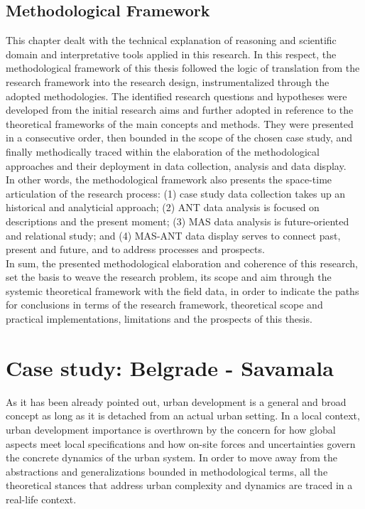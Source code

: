 \documentclass[11pt]{report}
\begin{document}
\section{Methodological Framework}

This chapter dealt with the technical explanation of reasoning and scientific domain and interpretative tools applied in this research.
In this respect, the methodological framework of this thesis followed the logic of translation from the research framework into the research design, instrumentalized through the adopted methodologies.
The identified research questions and hypotheses were developed from the initial research aims and further adopted in reference to the theoretical frameworks of the main concepts and methods. 
They were presented in a consecutive order, then bounded in the scope of the chosen case study, and finally methodically traced within the elaboration of the methodological approaches and their deployment in data collection, analysis and data display.
\\
In other words, the methodological framework also presents the space-time articulation of the research process:
(1) case study data collection takes up an historical and analyticial approach;
(2) ANT data analysis is focused on descriptions and the present moment;
(3) MAS data analysis is future-oriented and relational study;
and
(4) MAS-ANT data display serves to connect past, present and future, and to address processes and prospects.
\\
In sum, the presented methodological elaboration and coherence of this research, set the basis to weave the research problem, its scope and aim through the systemic theoretical framework with the field data, in order to indicate the paths for conclusions in terms of the research framework, theoretical scope and practical implementations, limitations and the prospects of this thesis.



\chapter{Case study: Belgrade - Savamala}

As it has been already pointed out, urban development is a general and broad concept as long as it is detached from an actual urban setting. In a local context, urban development importance is overthrown by the concern for how global aspects meet local specifications and how on-site forces and uncertainties govern the concrete dynamics of the urban system. In order to move away from the abstractions and generalizations bounded in methodological terms, all the theoretical stances that address urban complexity and dynamics are traced in a real-life context.
\\
\end{document}
